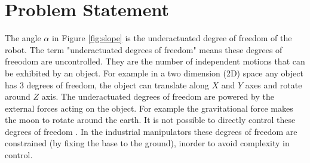\section{Problem Statement}
	The angle $\alpha$ in Figure \ref{fig:slope} is the underactuated degree of freedom of the robot. 
    The term "underactuated degrees of freedom" means these degrees of freeodom are uncontrolled. They are the number of independent motions that can be exhibited by an object. For example in a two dimension (2D) space any object has 3 degrees of freedom, the object can translate along $X$ and $Y$ axes and rotate around $Z$ axis. The underactuated degrees of freedom are powered by the external forces acting on the object. For example the gravitational force makes the moon to rotate around the earth. It is not possible to directly control these degrees of freedom \citep{sab00}. In the industrial manipulators these degrees of freedom are constrained (by fixing the base to the ground), inorder to avoid complexity in control.
